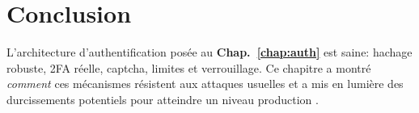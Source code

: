 \section{Conclusion}
\noindent L'architecture d'authentification posée au \textbf{Chap.~\ref{chap:auth}} est saine: hachage robuste, 2FA réelle, captcha, limites et verrouillage. Ce chapitre a montré \emph{comment} ces mécanismes résistent aux attaques usuelles et a mis en lumière des durcissements potentiels pour atteindre un niveau \og production \fg{}.


